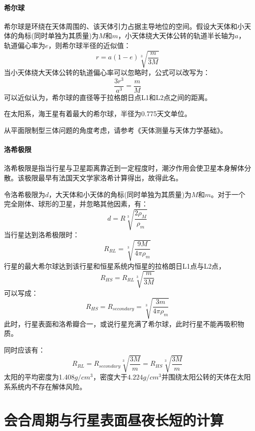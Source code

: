 \paragraph{希尔球}
希尔球是环绕在天体周围的、该天体引力占据主导地位的空间。假设大天体和小天体的角标(同时单独为其质量)为$M$和$m$，小天体绕大天体公转的轨道半长轴为$a$，轨道偏心率为$e$，则希尔球半径的近似值：
\begin{equation}
	r=a(1-e)\sqrt[3]{\frac{m}{3M}}
\end{equation}
当小天体绕大天体公转的轨道偏心率可以忽略时，公式可以改写为：
\begin{equation}
	\frac{3r^3}{a^3}=\frac{m}{M}
\end{equation}
可以近似认为，希尔球的直径等于拉格朗日点L1和L2点之间的距离。

在太阳系，海王星有着最大的希尔球，半径为0.775天文单位。

从平面限制型三体问题的角度考虑，请参考《天体测量与天体力学基础》。
\paragraph{洛希极限}
洛希极限是指当行星与卫星距离靠近到一定程度时，潮汐作用会使卫星本身解体分散。该极限最早有法国天文学家洛希计算得出，故得此名。

令洛希极限为$d$，大天体和小天体的角标(同时单独为其质量)为$M$和$m$。对于一个完全刚体、球形的卫星，并忽略其他因素，有：
\begin{equation}
	d=R\sqrt[3]{\frac{2\rho_{M}}{\rho_{m}}}
\end{equation}
当行星达到洛希极限时：
\begin{equation}
	R_{RL}=\sqrt[3]{\frac{9M}{4\pi\rho_{m}}}
\end{equation}
行星的最大希尔球达到该行星和恒星系统内恒星的拉格朗日L1点与L2点，
\begin{equation}
	R_{HS}=R_{RL}\sqrt[3]{\frac{m}{3M}}
\end{equation}
可以写成：
\begin{equation}
	R_{HS}=R_{secondary}=\sqrt[3]{\frac{3m}{4\pi\rho_{m}}}
\end{equation}
此时，行星表面和洛希瓣合一，或说行星充满了希尔球，此时行星不能再吸积物质。

同时应该有：
\begin{equation}
	R_{RL}=R_{secondary}\sqrt[3]{\frac{3M}{m}}=R_{HS}\sqrt[3]{\frac{3M}{m}}
\end{equation}
太阳的平均密度为1.408$g/cm^3$，密度大于$4.224g/cm^3$并围绕太阳公转的天体在太阳系系统内不存在解体风险。
\section{会合周期与行星表面昼夜长短的计算}

